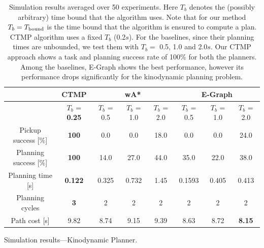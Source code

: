 \documentclass[a4paper]{report}
\begin{document}
\begin{table}[t]
\begin{subtable}[h]{\textwidth}
\centering
\begin{adjustbox}{width=0.75\textwidth}
\begin{tabular}{|c||c||c|c|c||c|c|c|}
\hline
   & CTMP 
   & \multicolumn{3}{c|}{wA*}
   & \multicolumn{3}{c|}{E-Graph}
   \\ \hline
   & $T_{b}$ = \textbf{0.25} 
   & $T_{b}$ = 0.5 & $T_{b}$ = 1.0 & $T_{b}$ = 2.0 
   & $T_{b}$ = 0.5 & $T_{b}$ = 1.0 & $T_{b}$ = 2.0 
   \\ \hline
Pickup success [\%]                   
& \textbf{100} & 0.0 & 0.0 & 18.0 & 0.0 & 0.0 & 24.0 \\ \hline
Planning success [\%]                  
& \textbf{100} & 14.0 & 27.0 & 44.0 & 35.0 & 22.0 & 38.0 \\ \hline
Planning time [s]
& \textbf{0.122} & 0.325 & 0.732 & 1.45 & 0.1593 & 0.405 & 0.413\\ \hline
Planning cycles 
& \textbf{3} & 2 & 2 & 2 & 2 & 2 & 2 \\ \hline
Path cost [s]                         & 9.82        & 8.74          & 9.15          & 9.39          & 8.63          & 8.72          & \textbf{8.15}          \\ \hline
\end{tabular}
\end{adjustbox}
\caption{Simulation results---Kinodynamic Planner.}
\label{tab:sim_results_p2}
\end{subtable}
\caption{Simulation results averaged over 50 experiments. Here $T_b$ denotes the (possibly arbitrary) time bound that the algorithm uses. Note that for our method $T_b = T_{\textrm{bound}}$ is the time bound that the algorithm is ensured to compute a plan.
%
CTMP algorithm uses a fixed $T_b$ (0.2$s$). For the baselines, since their planning times are unbounded, we test them with $T_b =$ 0.5, 1.0 and 2.0$s$. Our CTMP approach shows a task and planning success rate of 100$\%$ for both the planners. Among the baselines, E-Graph shows the best performance, however its performance drops significantly for the kinodynamic planning problem.}
\label{tab:sim_results}
\end{table}

\end{document}
